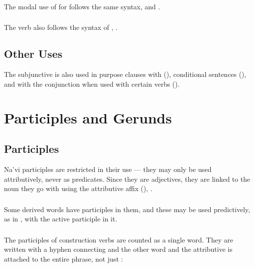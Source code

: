 \subsubsection{} The modal use of   for 
follows the same syntax,   and  .  

\subsubsection{} The verb   also follows the syntax
of ,   
.

\subsection{Other Uses} The subjunctive is also used in purpose
clauses with  (), conditional sentences
(), and with the conjunction 
when used with certain verbs (). 


\section{Participles and Gerunds}

\subsection{Participles} 
Na'vi participles are restricted in their use --- they may only be
used attributively, never as predicates.  Since they are adjectives,
they are linked to the noun they go with using the attributive affix
 (),  .\label{syn:part:attr}

\subsubsection{} Some derived words have participles in them, and
these may be used predictively, as in 
, with the active participle  in it.

\subsubsection{} The participles of  construction verbs are
counted as a single word.  They are written with a hyphen connecting
 and the other word and the attributive  is attached to the
entire phrase, not just : \label{syn:participle:si-const}

